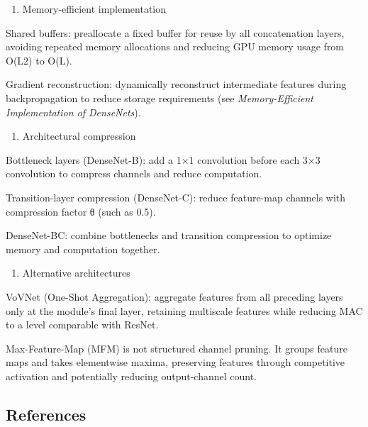 \begin{enumerate}
\def\labelenumi{(\arabic{enumi})}
\tightlist
\item
  Memory-efficient implementation
\end{enumerate}

Shared buffers: preallocate a fixed buffer for reuse by all concatenation layers, avoiding repeated memory allocations and reducing GPU memory usage from O(L2) to O(L).

Gradient reconstruction: dynamically reconstruct intermediate features during backpropagation to reduce storage requirements (see \emph{Memory-Efficient Implementation of DenseNets}).

\begin{enumerate}
\def\labelenumi{(\arabic{enumi})}
\setcounter{enumi}{1}
\tightlist
\item
  Architectural compression
\end{enumerate}

Bottleneck layers (DenseNet-B): add a 1×1 convolution before each 3×3 convolution to compress channels and reduce computation.

Transition-layer compression (DenseNet-C): reduce feature-map channels with compression factor θ (such as 0.5).

DenseNet-BC: combine bottlenecks and transition compression to optimize memory and computation together.

\begin{enumerate}
\def\labelenumi{(\arabic{enumi})}
\setcounter{enumi}{2}
\tightlist
\item
  Alternative architectures
\end{enumerate}

VoVNet (One-Shot Aggregation): aggregate features from all preceding layers only at the module's final layer, retaining multiscale features while reducing MAC to a level comparable with ResNet.

Max-Feature-Map (MFM) is not structured channel pruning. It groups feature maps and takes elementwise maxima, preserving features through competitive activation and potentially reducing output-channel count.

\FloatBarrier
{}
\hypertarget{references-15}{%
\subsection{References}\label{references-15}}

